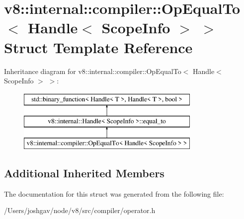 \hypertarget{structv8_1_1internal_1_1compiler_1_1_op_equal_to_3_01_handle_3_01_scope_info_01_4_01_4}{}\section{v8\+:\+:internal\+:\+:compiler\+:\+:Op\+Equal\+To$<$ Handle$<$ Scope\+Info $>$ $>$ Struct Template Reference}
\label{structv8_1_1internal_1_1compiler_1_1_op_equal_to_3_01_handle_3_01_scope_info_01_4_01_4}
Inheritance diagram for v8\+:\+:internal\+:\+:compiler\+:\+:Op\+Equal\+To$<$ Handle$<$ Scope\+Info $>$ $>$\+:\begin{figure}[H]
\begin{center}
\leavevmode
\includegraphics[height=3.000000cm]{structv8_1_1internal_1_1compiler_1_1_op_equal_to_3_01_handle_3_01_scope_info_01_4_01_4}
\end{center}
\end{figure}
\subsection*{Additional Inherited Members}


The documentation for this struct was generated from the following file\+:\begin{DoxyCompactItemize}
\item 
/\+Users/joshgav/node/v8/src/compiler/operator.\+h\end{DoxyCompactItemize}
